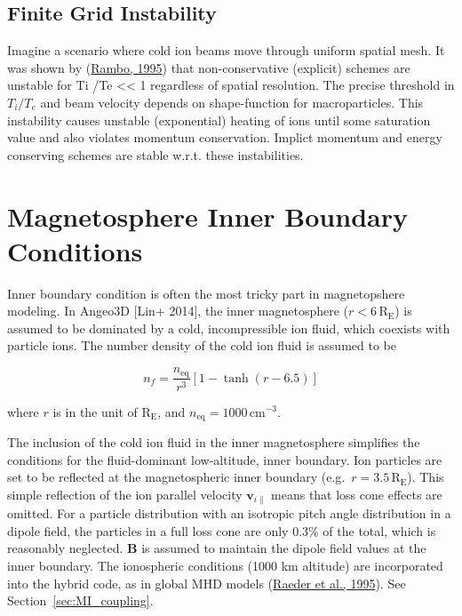 \documentclass[
  notoc %
]{tufte-book}
\begin{document}
\hypertarget{finite-grid-instability}{%
\subsection{Finite Grid Instability}\label{finite-grid-instability}}

Imagine a scenario where cold ion beams move through uniform spatial
mesh. It was shown by (\protect\hyperlink{ref-rambo1995finite}{Rambo,
1995}) that non-conservative (explicit) schemes are unstable for Ti /Te
\textless\textless{} 1 regardless of spatial resolution. The precise
threshold in \(T_i /T_e\) and beam velocity depends on shape-function
for macroparticles. This instability causes unstable (exponential)
heating of ions until some saturation value and also violates momentum
conservation. Implict momentum and energy conserving schemes are stable
w.r.t. these instabilities.

\hypertarget{magnetosphere-inner-boundary-conditions}{%
\section{Magnetosphere Inner Boundary
Conditions}\label{magnetosphere-inner-boundary-conditions}}

Inner boundary condition is often the most tricky part in magnetopshere
modeling. In Angeo3D {[}Lin+ 2014{]}, the inner magnetosphere
(\(r<6\,\text{R}_\text{E}\)) is assumed to be dominated by a cold,
incompressible ion fluid, which coexists with particle ions. The number
density of the cold ion fluid is assumed to be

\[
n_f = \frac{n_\text{eq}}{r^3}[1-\tanh(r-6.5)]
\]

where \(r\) is in the unit of \(\text{R}_\text{E}\), and
\(n_\text{eq}=1000\,\text{cm}^{-3}\).

The inclusion of the cold ion fluid in the inner magnetosphere
simplifies the conditions for the fluid-dominant low-altitude, inner
boundary. Ion particles are set to be reflected at the magnetospheric
inner boundary (e.g.~\(r=3.5\,\text{R}_\text{E}\)). This simple
reflection of the ion parallel velocity \(\mathbf{v}_{i\parallel}\)
means that loss cone effects are omitted. For a particle distribution
with an isotropic pitch angle distribution in a dipole field, the
particles in a full loss cone are only 0.3\% of the total, which is
reasonably neglected. \(\mathbf{B}\) is assumed to maintain the dipole
field values at the inner boundary. The ionospheric conditions (1000 km
altitude) are incorporated into the hybrid code, as in global MHD models
(\protect\hyperlink{ref-raeder1995}{Raeder et al., 1995}). See
Section~\ref{sec:MI_coupling}.
\end{document}
